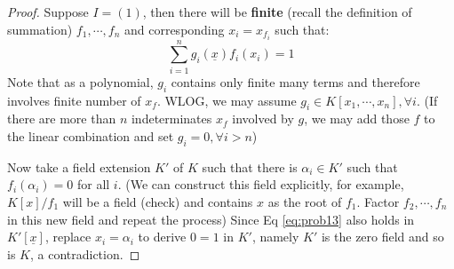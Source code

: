 \documentclass{solution}
\begin{document}
\begin{proof}
    Suppose $I = (1)$, then there will be \textbf{finite} (recall the definition of summation) $f_1, \cdots, f_n$ and corresponding $x_i = x_{f_i}$ such that:
    \begin{equation}\label{eq:prob13}
        \sum\limits_{i = 1}^{n} g_i(\underline{x}) f_i(x_i) = 1
    \end{equation}
    Note that as a polynomial, $g_i$ contains only finite many terms and therefore involves finite number of $x_f$. WLOG, we may assume $g_i \in K[x_1, \cdots, x_n], \forall i$. (If there are more than $n$ indeterminates $x_f$ involved by $g$, we may add those $f$ to the linear combination and set $g_i = 0, \forall i \gt n$)

    Now take a field extension $K'$ of $K$ such that there is $\alpha_i \in K'$ such that $f_i(\alpha_i) = 0$ for all $i$. (We can construct this field explicitly, for example, $K[x] / f_1$ will be a field (check) and contains $x$ as the root of $f_1$. Factor $f_2, \cdots, f_n$ in this new field and repeat the process) Since Eq \ref{eq:prob13} also holds in $K'[\underline{x}]$, replace $x_i = \alpha_i$ to derive $0 = 1$ in $K'$, namely $K'$ is the zero field and so is $K$, a contradiction.


\end{proof}
\end{document}
